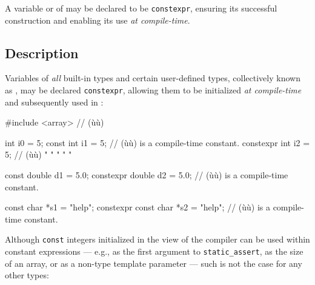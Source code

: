 


\setcounter{table}{0}
\setcounter{footnote}{0}
\setcounter{lstlisting}{0}

A variable or  of  may be
declared to be \lstinline!constexpr!, ensuring its successful construction
and enabling its use \emph{at compile-time}.

\subsection[Description]{Description}\label{description}

Variables of \emph{all} built-in types and certain user-defined types,
collectively known as , may be declared
\lstinline!constexpr!, allowing them to be initialized \emph{at
compile-time} and subsequently used in :

\begin{emcppshiddenlisting}[emcppsbatch=e1]
#include <array>  // (ù{}ù)
\end{emcppshiddenlisting}
\begin{emcppslisting}[emcppsbatch=e1]
          int i0 = 5;
    const int i1 = 5;               // (ù{}ù) is a compile-time constant.
constexpr int i2 = 5;               // (ù{}ù)  " "    "      "     "

    const double d1 = 5.0;
constexpr double d2 = 5.0;          // (ù{}ù) is a compile-time constant.

          const char *s1 = "help";
constexpr const char *s2 = "help";  // (ù{}ù) is a compile-time constant.
\end{emcppslisting}

Although \lstinline!const! integers initialized in the view of the compiler
can be used within constant expressions --- e.g., as the first argument
to \lstinline!static_assert!, as the size of an array, or as a non-type
template parameter --- such is not the case for any other types:

